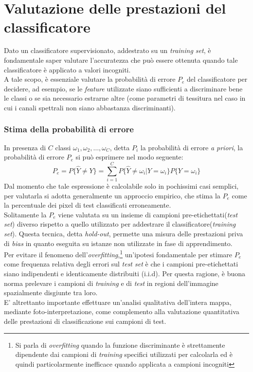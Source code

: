 
\chapter{Valutazione delle prestazioni del classificatore}
\label{cap:prestazioni}

Dato un classificatore supervisionato, addestrato su un \emph{training set}, è fondamentale saper valutare l'accuratezza che può essere ottenuta quando tale classificatore è applicato a valori incogniti.\\
A tale scopo, è essenziale valutare la probabilità di errore $P_e$ del classificatore per decidere, ad esempio, se le \emph{feature} utilizzate siano sufficienti a discriminare bene le classi o se sia necessario estrarne altre (come parametri di tessitura nel caso in cui i canali spettrali non siano abbastanza discriminanti).
\clearpage

\subsection{Stima della probabilità di errore}
In presenza di $C$ classi $\omega_1,\omega_2, \ldots, \omega_C$, detta $P_i$ la probabilità di errore \emph{a priori}, la probabilità di errore $P_e$ si può esprimere nel modo seguente:
\begin{equation}
\label{eq:P_e}
P_e = P\lbrace\widehat{Y}\neq Y\rbrace= {\sum_{i=1}^C P\lbrace\widehat{Y}\neq \omega_i\vert Y = \omega_i\rbrace}P\lbrace Y =\omega_i\rbrace
\end{equation}
Dal momento che tale espressione è calcolabile solo in pochissimi casi semplici, per valutarla si adotta generalmente un approccio empirico, che stima la $P_e$ come la percentuale dei pixel di test classificati erroneamente.\\
Solitamente la $P_e$ viene valutata su un insieme di campioni pre-etichettati(\emph{test set}) diverso rispetto a quello utilizzato per addestrare il classificatore(\emph{training set}). Questa tecnica, detta \emph{hold-out}, permette una misura delle prestazioni priva di \emph{bias} in quanto eseguita su istanze non utilizzate in fase di apprendimento.\\
Per evitare il fenomeno dell'\emph{overfitting},\footnote{Si parla di \emph{overfitting} quando la funzione discriminante è strettamente dipendente dai campioni di \emph{training} specifici utilizzati per calcolarla ed è quindi particolarmente inefficace quando applicata a campioni incogniti} un'ipotesi fondamentale per stimare $P_e$ come frequenza relativa degli errori sul \emph{test set} è che i campioni pre-etichettati siano indipendenti e identicamente distribuiti (i.i.d). Per questa ragione, è buona norma prelevare i campioni di \emph{training} e di \emph{test} in regioni dell'immagine spazialmente disgiunte tra loro.\\
E' altrettanto importante effettuare un'analisi qualitativa dell'intera mappa, mediante foto-interpretazione, come complemento alla valutazione quantitativa delle prestazioni di classificazione sui campioni di test.

